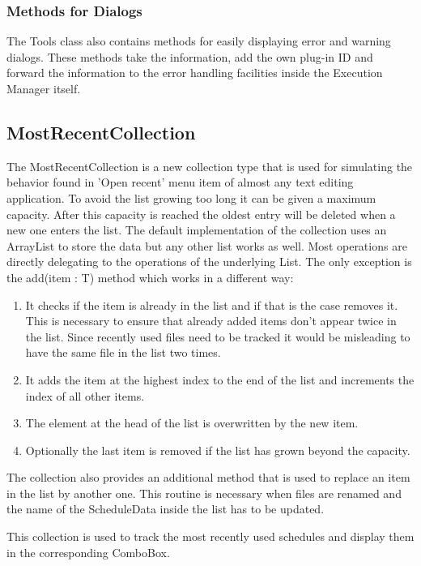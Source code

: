 \subsubsection{Methods for Dialogs}
\label{section:ToolsMethodsDialogs}
The Tools class also contains methods for easily displaying error and warning dialogs.
These methods take the information, add the own plug-in ID and forward the information to the 
error handling facilities inside the Execution Manager itself.


\subsection{MostRecentCollection}
\label{section:MostRecentCollection}
The MostRecentCollection is a new collection type that is used for simulating the 
behavior found in 'Open recent' menu item of almost any text editing application.
To avoid the list growing too long it can be given a maximum capacity. After this capacity
is reached the oldest entry will be deleted when a new one enters the list.
The default implementation of the collection uses an ArrayList to store the data but any
other list works as well. Most operations are directly delegating to the operations of the 
underlying List. 
The only exception is the add(item : T) method which works in a different way:
\begin{enumerate}
 \item It checks if the item is already in the list and if that is the case removes it. 
This is necessary to ensure that already added items don't appear twice in the list. Since 
recently used files need to be tracked it would be misleading to have the same file in the list
two times.
 \item It adds the item at the highest index to the end of the list and increments the index of all other items.
 \item The element at the head of the list is overwritten by the new item.
 \item Optionally the last item is removed if the list has grown beyond the capacity.
\end{enumerate}
The collection also provides an additional method that is used to replace an item in
the list by another one. This routine is necessary when files are renamed and the name of the ScheduleData inside
the list has to be updated.

This collection is used to track the most recently used schedules and display them
in the corresponding ComboBox.

